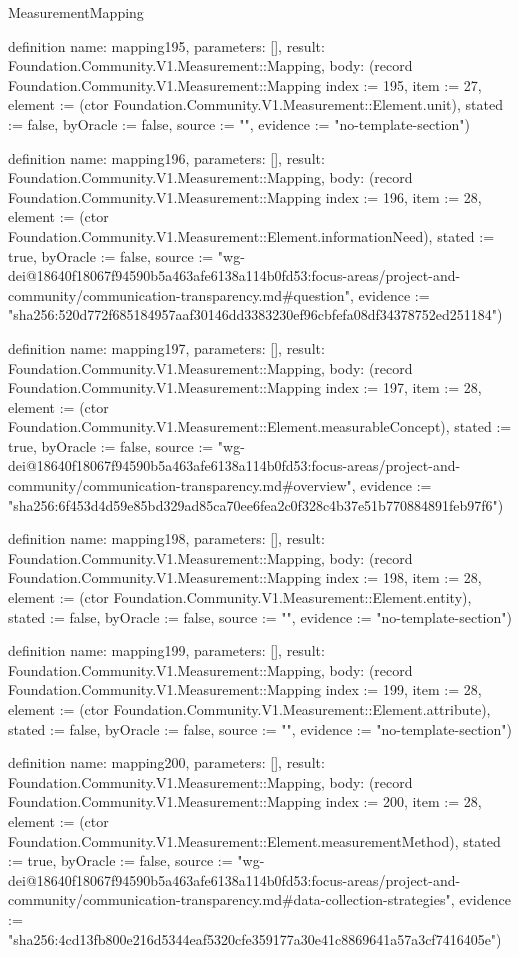 \begin{lexlean}{MeasurementMapping}
\begin{semanticmodule}
definition{
  name: mapping195,
  parameters: [],
  result: Foundation.Community.V1.Measurement::Mapping,
  body: (record Foundation.Community.V1.Measurement::Mapping {index := 195, item := 27, element := (ctor Foundation.Community.V1.Measurement::Element.unit), stated := false, byOracle := false, source := "", evidence := "no-template-section"})
}

definition{
  name: mapping196,
  parameters: [],
  result: Foundation.Community.V1.Measurement::Mapping,
  body: (record Foundation.Community.V1.Measurement::Mapping {index := 196, item := 28, element := (ctor Foundation.Community.V1.Measurement::Element.informationNeed), stated := true, byOracle := false, source := "wg-dei@18640f18067f94590b5a463afe6138a114b0fd53:focus-areas/project-and-community/communication-transparency.md#question", evidence := "sha256:520d772f685184957aaf30146dd3383230ef96cbfefa08df34378752ed251184"})
}

definition{
  name: mapping197,
  parameters: [],
  result: Foundation.Community.V1.Measurement::Mapping,
  body: (record Foundation.Community.V1.Measurement::Mapping {index := 197, item := 28, element := (ctor Foundation.Community.V1.Measurement::Element.measurableConcept), stated := true, byOracle := false, source := "wg-dei@18640f18067f94590b5a463afe6138a114b0fd53:focus-areas/project-and-community/communication-transparency.md#overview", evidence := "sha256:6f453d4d59e85bd329ad85ca70ee6fea2c0f328c4b37e51b770884891feb97f6"})
}

definition{
  name: mapping198,
  parameters: [],
  result: Foundation.Community.V1.Measurement::Mapping,
  body: (record Foundation.Community.V1.Measurement::Mapping {index := 198, item := 28, element := (ctor Foundation.Community.V1.Measurement::Element.entity), stated := false, byOracle := false, source := "", evidence := "no-template-section"})
}

definition{
  name: mapping199,
  parameters: [],
  result: Foundation.Community.V1.Measurement::Mapping,
  body: (record Foundation.Community.V1.Measurement::Mapping {index := 199, item := 28, element := (ctor Foundation.Community.V1.Measurement::Element.attribute), stated := false, byOracle := false, source := "", evidence := "no-template-section"})
}

definition{
  name: mapping200,
  parameters: [],
  result: Foundation.Community.V1.Measurement::Mapping,
  body: (record Foundation.Community.V1.Measurement::Mapping {index := 200, item := 28, element := (ctor Foundation.Community.V1.Measurement::Element.measurementMethod), stated := true, byOracle := false, source := "wg-dei@18640f18067f94590b5a463afe6138a114b0fd53:focus-areas/project-and-community/communication-transparency.md#data-collection-strategies", evidence := "sha256:4cd13fb800e216d5344eaf5320cfe359177a30e41c8869641a57a3cf7416405e"})
}


\end{semanticmodule}
\end{lexlean}
